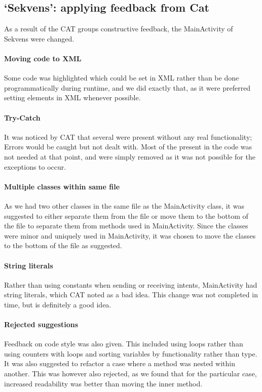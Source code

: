 \subsection{`Sekvens': applying feedback from Cat}\label{subsec:collab_sekvensresult}
As a result of the CAT groups constructive feedback, the MainActivity of Sekvens were changed.

\paragraph{Moving code to XML}
Some code was highlighted which could be set in XML rather than be done programmatically during runtime, and we did exactly that, as it were preferred setting elements in XML whenever possible.

\paragraph{Try-Catch}
It was noticed by CAT that several  were present without any real functionality; Errors would be caught but not dealt with. Most of the  present in the code was not needed at that point, and were simply removed as it was not possible for the exceptions to occur.

\paragraph{Multiple classes within same file}
As we had two other classes in the same file as the MainActivity class, it was suggested to either separate them from the file or move them to the bottom of the file to separate them from methods used in MainActivity. Since the classes were minor and uniquely used in MainActivity, it was chosen to move the classes to the bottom of the file as suggested.

\paragraph{String literals}
Rather than using constants when sending or receiving intents, MainActivity had string literals, which CAT noted as a bad idea. This change was not completed in time, but is definitely a good idea.

\paragraph{Rejected suggestions}
Feedback on code style was also given. This included using  loops rather than using counters with  loops and sorting variables by functionality rather than type. It was also suggested to refactor a case where a method was nested within another. This was however also rejected, as we found that for the particular case, increased readability was better than moving the inner method.